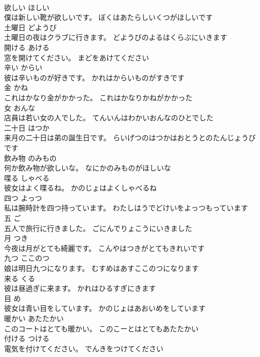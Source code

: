 \documentclass[8pt]{extreport}
\begin{document}
\begin{CJK}{UTF8}{min}
\\	欲しい	ほしい	
\\	僕は新しい靴が欲しいです。	ぼくはあたらしいくつがほしいです	
\\	土曜日	どようび	
\\	土曜日の夜はクラブに行きます。	どようびのよるはくらぶにいきます	
\\	開ける	あける	
\\	窓を開けてください。	まどをあけてください	
\\	辛い	からい	
\\	彼は辛いものが好きです。	かれはからいものがすきです	
\\	金	かね	
\\	これはかなり金がかかった。	これはかなりかねがかかった	
\\	女	おんな	
\\	店員は若い女の人でした。	てんいんはわかいおんなのひとでした	
\\	二十日	はつか	
\\	来月の二十日は弟の誕生日です。	らいげつのはつかはおとうとのたんじょうびです	
\\	飲み物	のみもの	
\\	何か飲み物が欲しいな。	なにかのみものがほしいな	
\\	喋る	しゃべる	
\\	彼女はよく喋るね。	かのじょはよくしゃべるね	
\\	四つ	よっつ	
\\	私は腕時計を四つ持っています。	わたしはうでどけいをよっつもっています	
\\	五	ご	
\\	五人で旅行に行きました。	ごにんでりょこうにいきました	
\\	月	つき	
\\	今夜は月がとても綺麗です。	こんやはつきがとてもきれいです	
\\	九つ	ここのつ	
\\	娘は明日九つになります。	むすめはあすここのつになります	
\\	来る	くる	
\\	彼は昼過ぎに来ます。	かれはひるすぎにきます	
\\	目	め	
\\	彼女は青い目をしています。	かのじょはあおいめをしています	
\\	暖かい	あたたかい	
\\	このコートはとても暖かい。	このこーとはとてもあたたかい	
\\	付ける	つける	
\\	電気を付けてください。	でんきをつけてください	

\end{CJK}
\end{document}
